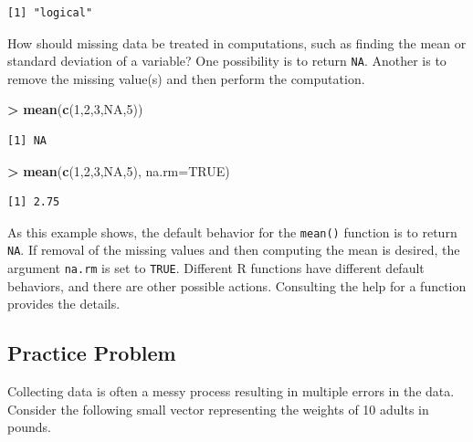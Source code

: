 \documentclass[
]{krantz}
\makeatletter
\newenvironment{Shaded}{\begin{snugshade}}{\end{snugshade}}
\newcommand{\DataTypeTok}[1]{\textcolor[rgb]{0.27,0.27,0.27}{#1}}
\newcommand{\DecValTok}[1]{\textcolor[rgb]{0.06,0.06,0.06}{#1}}
\newcommand{\KeywordTok}[1]{\textcolor[rgb]{0.27,0.27,0.27}{\textbf{#1}}}
\newcommand{\NormalTok}[1]{#1}
\newcommand{\OperatorTok}[1]{\textcolor[rgb]{0.43,0.43,0.43}{\textbf{#1}}}
\newcommand{\OtherTok}[1]{\textcolor[rgb]{0.37,0.37,0.37}{#1}}
\newcommand{\StringTok}[1]{\textcolor[rgb]{0.5,0.5,0.5}{#1}}
\newenvironment{kframe}{%
\medskip{}
\setlength{\fboxsep}{.8em}
 \def\at@end@of@kframe{}%
 \ifinner\ifhmode%
  \def\at@end@of@kframe{\end{minipage}}%
  \begin{minipage}{\columnwidth}%
 \fi\fi%
 \def\FrameCommand##1{\hskip\@totalleftmargin \hskip-\fboxsep
 \colorbox{shadecolor}{##1}\hskip-\fboxsep
     \hskip-\linewidth \hskip-\@totalleftmargin \hskip\columnwidth}%
 \MakeFramed {\advance\hsize-\width
   \@totalleftmargin\z@ \linewidth\hsize
   \@setminipage}}%
 {\par\unskip\endMakeFramed%
 \at@end@of@kframe}
\renewenvironment{Shaded}{\begin{kframe}}{\end{kframe}}
\makeatother
\begin{document}
\begin{verbatim}
[1] "logical"
\end{verbatim}

How should missing data be treated in computations, such as finding the mean or standard deviation of a variable? One possibility is to return \texttt{NA}. Another is to remove the missing value(s) and then perform the computation.

\begin{Shaded}
\begin{Highlighting}[]
\OperatorTok{\textgreater{}}\StringTok{ }\KeywordTok{mean}\NormalTok{(}\KeywordTok{c}\NormalTok{(}\DecValTok{1}\NormalTok{,}\DecValTok{2}\NormalTok{,}\DecValTok{3}\NormalTok{,}\OtherTok{NA}\NormalTok{,}\DecValTok{5}\NormalTok{))}
\end{Highlighting}
\end{Shaded}

\begin{verbatim}
[1] NA
\end{verbatim}

\begin{Shaded}
\begin{Highlighting}[]
\OperatorTok{\textgreater{}}\StringTok{ }\KeywordTok{mean}\NormalTok{(}\KeywordTok{c}\NormalTok{(}\DecValTok{1}\NormalTok{,}\DecValTok{2}\NormalTok{,}\DecValTok{3}\NormalTok{,}\OtherTok{NA}\NormalTok{,}\DecValTok{5}\NormalTok{), }\DataTypeTok{na.rm=}\OtherTok{TRUE}\NormalTok{)}
\end{Highlighting}
\end{Shaded}

\begin{verbatim}
[1] 2.75
\end{verbatim}

As this example shows, the default behavior for the \texttt{mean()} function is to return \texttt{NA}. If removal of the missing values and then computing the mean is desired, the argument \texttt{na.rm} is set to \texttt{TRUE}. Different R functions have different default behaviors, and there are other possible actions. Consulting the help for a function provides the details.

\hypertarget{ch4PP2}{%
\subsection{Practice Problem}\label{ch4PP2}}

Collecting data is often a messy process resulting in multiple errors in the data. Consider the following small vector representing the weights of 10 adults in pounds.
\end{document}
